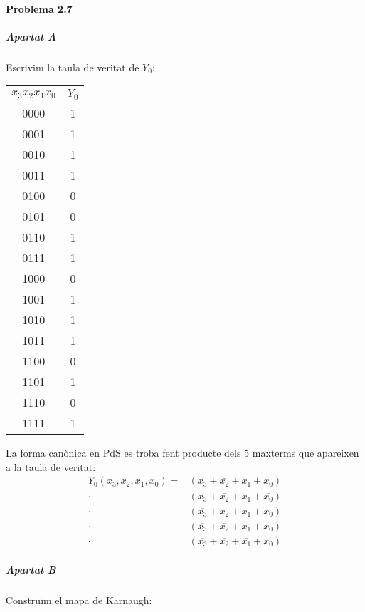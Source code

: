 \documentclass[catalan,border=15pt,class=scrartcl,multi=minipage]{standalone}
\begin{document}
\begin{minipage}{30em}

\paragraph{Problema 2.7} \hspace{0em}

\vspace{1em}


\subparagraph{Apartat A}

Escrivim la taula de veritat de $Y_0$:

\begin{center} \begin{tabular}{cc}
$x_3x_2x_1x_0$ & $Y_0$ \\
\hline
0000 & 1 \\
0001 & 1 \\
0010 & 1 \\
0011 & 1 \\
0100 & 0 \\
0101 & 0 \\
0110 & 1 \\
0111 & 1 \\
1000 & 0 \\
1001 & 1 \\
1010 & 1 \\
1011 & 1 \\
1100 & 0 \\
1101 & 1 \\
1110 & 0 \\
1111 & 1
\end{tabular} \end{center}

La forma canònica en PdS es troba fent producte dels 5 maxterms que apareixen a la taula de veritat:
%
\begin{align*}
  Y_0(x_3,x_2,x_1,x_0) =&
    \left( x_3 + \overline{x_2} + x_1 + x_0 \right) \\ \cdot&
    \left( x_3 + \overline{x_2} + x_1 + \overline{x_0} \right) \\ \cdot&
    \left( \overline{x_3} + x_2 + x_1 + x_0 \right) \\ \cdot&
    \left( \overline{x_3} + \overline{x_2} + x_1 + x_0 \right) \\ \cdot&
    \left( \overline{x_3} + \overline{x_2} + \overline{x_1} + x_0 \right)
\end{align*}


\subparagraph{Apartat B}

Construïm el mapa de Karnaugh:


\end{minipage}
\end{document}
